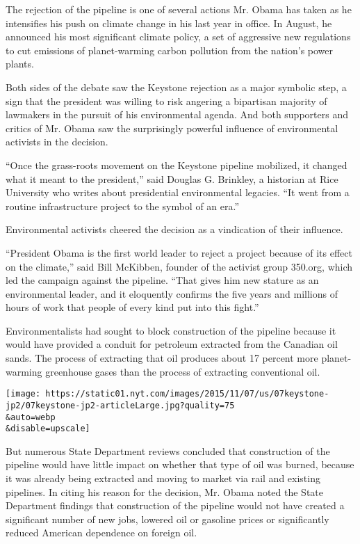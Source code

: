 The rejection of the pipeline is one of several actions Mr. Obama has
taken as he intensifies his push on climate change in his last year in
office. In August, he announced his most significant climate policy, a
set of aggressive new regulations to cut emissions of planet-warming
carbon pollution from the nation's power plants.

Both sides of the debate saw the Keystone rejection as a major symbolic
step, a sign that the president was willing to risk angering a
bipartisan majority of lawmakers in the pursuit of his environmental
agenda. And both supporters and critics of Mr. Obama saw the
surprisingly powerful influence of environmental activists in the
decision.

``Once the grass-roots movement on the Keystone pipeline mobilized, it
changed what it meant to the president,'' said Douglas G. Brinkley, a
historian at Rice University who writes about presidential environmental
legacies. ``It went from a routine infrastructure project to the symbol
of an era.''

Environmental activists cheered the decision as a vindication of their
influence.

``President Obama is the first world leader to reject a project because
of its effect on the climate,'' said Bill McKibben, founder of the
activist group 350.org, which led the campaign against the pipeline.
``That gives him new stature as an environmental leader, and it
eloquently confirms the five years and millions of hours of work that
people of every kind put into this fight.''

Environmentalists had sought to block construction of the pipeline
because it would have provided a conduit for petroleum extracted from
the Canadian oil sands. The process of extracting that oil produces
about 17 percent more planet-warming greenhouse gases than the process
of extracting conventional oil.

\texttt{[image: https://static01.nyt.com/images/2015/11/07/us/07keystone-jp2/07keystone-jp2-articleLarge.jpg?quality=75\\\&auto=webp\\\&disable=upscale]}

But numerous State Department reviews concluded that construction of the
pipeline would have little impact on whether that type of oil was
burned, because it was already being extracted and moving to market via
rail and existing pipelines. In citing his reason for the decision, Mr.
Obama noted the State Department findings that construction of the
pipeline would not have created a significant number of new jobs,
lowered oil or gasoline prices or significantly reduced American
dependence on foreign oil.

